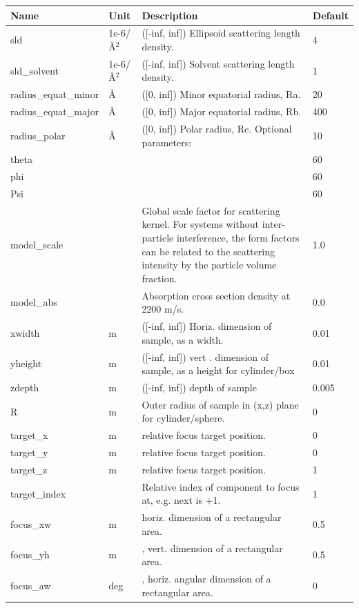 \begin{longtable}{p{}p{}p{}p{}}
\toprule
\textbf{Name} & \textbf{Unit} & \textbf{Description} & \textbf{Default} \\
\midrule
\endhead
sld & 1e-6/\AA{}$^{2}$ & ([-inf, inf]) Ellipsoid scattering length density. & 4 \\
sld\_solvent & 1e-6/\AA{}$^{2}$ & ([-inf, inf]) Solvent scattering length density. & 1 \\
radius\_equat\_minor & \AA{} & ([0, inf]) Minor equatorial radius, Ra. & 20 \\
radius\_equat\_major & \AA{} & ([0, inf]) Major equatorial radius, Rb. & 400 \\
radius\_polar & \AA{} & ([0, inf]) Polar radius, Rc. Optional parameters: & 10 \\
theta &  &  & 60 \\
phi &  &  & 60 \\
Psi &  &  & 60 \\
model\_scale &   & Global scale factor for scattering kernel. For systems without inter-particle interference, the form factors can be related to the scattering intensity by the particle volume fraction. & 1.0 \\
model\_abs &   & Absorption cross section density at 2200 m/s. & 0.0 \\
xwidth & m & ([-inf, inf]) Horiz. dimension of sample, as a width. & 0.01 \\
yheight & m & ([-inf, inf]) vert . dimension of sample, as a height for cylinder/box & 0.01 \\
zdepth & m & ([-inf, inf]) depth of sample & 0.005 \\
R & m & Outer radius of sample in (x,z) plane for cylinder/sphere. & 0 \\
target\_x & m & relative focus target position. & 0 \\
target\_y & m & relative focus target position. & 0 \\
target\_z & m & relative focus target position. & 1 \\
target\_index &   & Relative index of component to focus at, e.g. next is +1. & 1 \\
focus\_xw & m & horiz. dimension of a rectangular area. & 0.5 \\
focus\_yh & m & , vert. dimension of a rectangular area. & 0.5 \\
focus\_aw & deg & , horiz. angular dimension of a rectangular area. & 0 \\

\end{longtable}
